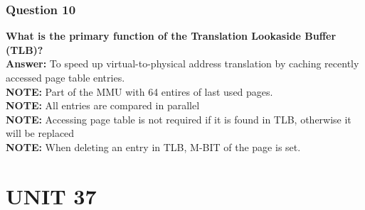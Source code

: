 \documentclass{article}
\begin{document}
\subsubsection*{Question 10}
\textbf{What is the primary function of the Translation Lookaside Buffer (TLB)?} \\
\textbf{Answer:} To speed up virtual-to-physical address translation by caching recently accessed page table entries. \\
\textbf{NOTE:} Part of the MMU with 64 entires of last used pages. \\
\textbf{NOTE:} All entries are compared in parallel \\
\textbf{NOTE:} Accessing page table is not required if it is found in TLB, otherwise it will be replaced \\
\textbf{NOTE:} When deleting an entry in TLB, M-BIT of the page is set.

\section*{UNIT 37}
\end{document}

